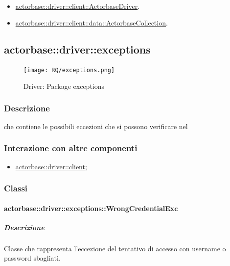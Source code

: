 \documentclass{scalatekids-article}
\begin{document}
\begin{itemize}
\item \hyperref[sec:actorbase::driver::client::ActorbaseDriver]{actorbase::driver::client::ActorbaseDriver}.
\item \hyperref[sec:actorbase::driver::client::data::ActorbaseCollection]{actorbase::driver::client::data::ActorbaseCollection}.
\end{itemize}


\subsection{actorbase::driver::exceptions}
\label{sec:actorbase::driver::exceptions}

\begin{figure}[H]
  \begin{center}
    \texttt{[image: RQ/exceptions.png]}
    \caption{Driver: Package exceptions}
  \end{center}
\end{figure}

\subsubsection{Descrizione}

 che contiene le possibili eccezioni che si possono verificare nel 

\subsubsection{Interazione con altre componenti}
\begin{itemize}
\item \hyperref[sec:actorbase::driver::client]{actorbase::driver::client};
\end{itemize}

\subsubsection{Classi}

\paragraph{actorbase::driver::exceptions::WrongCredentialExc}

\subparagraph{Descrizione}

Classe che rappresenta l'eccezione del tentativo di accesso con username o password sbagliati.
\end{document}
